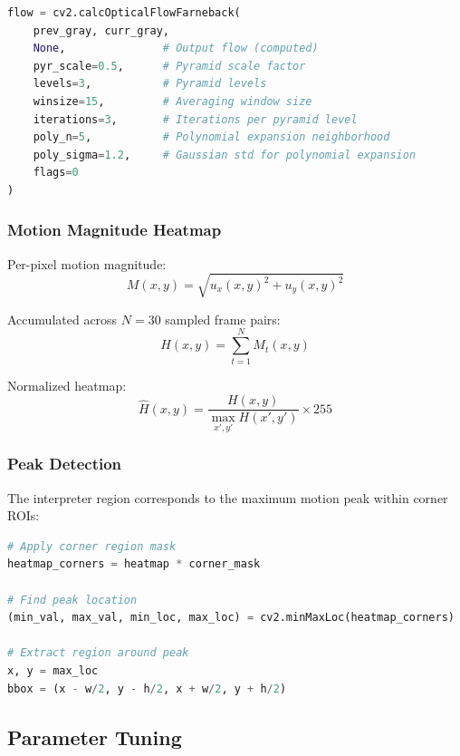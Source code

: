 \documentclass[11pt,a4paper]{article}
\begin{document}
\begin{lstlisting}[language=Python]
flow = cv2.calcOpticalFlowFarneback(
    prev_gray, curr_gray,
    None,               # Output flow (computed)
    pyr_scale=0.5,      # Pyramid scale factor
    levels=3,           # Pyramid levels
    winsize=15,         # Averaging window size
    iterations=3,       # Iterations per pyramid level
    poly_n=5,           # Polynomial expansion neighborhood
    poly_sigma=1.2,     # Gaussian std for polynomial expansion
    flags=0
)
\end{lstlisting}

\subsubsection{Motion Magnitude Heatmap}

Per-pixel motion magnitude:
\begin{equation}
M(x, y) = \sqrt{u_x(x, y)^2 + u_y(x, y)^2}
\end{equation}

Accumulated across $N = 30$ sampled frame pairs:
\begin{equation}
H(x, y) = \sum_{t=1}^{N} M_t(x, y)
\end{equation}

Normalized heatmap:
\begin{equation}
\hat{H}(x, y) = \frac{H(x, y)}{\max_{x',y'} H(x', y')} \times 255
\end{equation}

\subsubsection{Peak Detection}

The interpreter region corresponds to the maximum motion peak within corner ROIs:

\begin{lstlisting}[language=Python]
# Apply corner region mask
heatmap_corners = heatmap * corner_mask

# Find peak location
(min_val, max_val, min_loc, max_loc) = cv2.minMaxLoc(heatmap_corners)

# Extract region around peak
x, y = max_loc
bbox = (x - w/2, y - h/2, x + w/2, y + h/2)
\end{lstlisting}

\subsection{Parameter Tuning}
\end{document}
